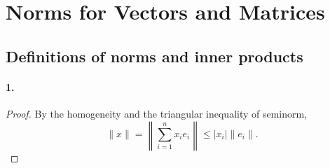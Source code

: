 \section{Norms for Vectors and Matrices}
\subsection{Definitions of norms and inner products}
  \paragraph{1.}
  \begin{proof}
    By the homogeneity and the triangular inequality of seminorm,
    \[
      \|x\|=\left\|\sum_{i=1}^n x_ie_i\right\|
      \le |x_i|\|e_i\|.
    \]
  \end{proof}

